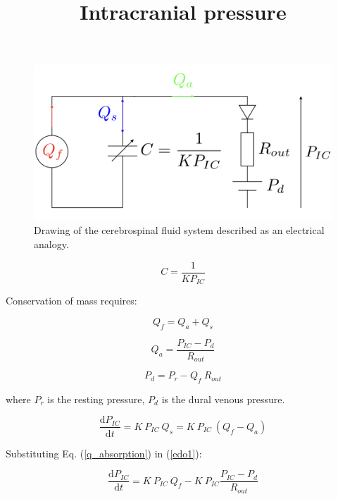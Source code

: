 \documentclass{config}
\title{Intracranial pressure}
\begin{document}
\maketitle

\begin{figure}[H]
\centering
\includegraphics[scale=0.3]{modele0D.png}
\caption{Drawing of the cerebrospinal fluid system described as an electrical analogy.}
\label{schema0D}
\end{figure}

\begin{equation}\label{compliance}
C = \frac{1}{K P_{IC}}
\end{equation}

Conservation of mass requires:

\begin{equation}\label{debit}
Q_f = Q_a + Q_s
\end{equation}

\begin{equation}\label{q_absorption}
Q_a = \frac{P_{IC} - P_d }{R_{out}}
\end{equation}

\begin{equation}\label{Pd}
P_d = P_r - Q_f ~ R_{out}
\end{equation}

where $P_r$ is the resting pressure, $P_d$ is the dural venous pressure.

\begin{equation}\label{edo1}
\frac{\mathrm{d}P_{IC}}{\mathrm{d}t} = K ~ P_{IC} ~ Q_s = K ~ P_{IC } ~ (Q_f - Q_a)
\end{equation}

Substituting Eq. (\ref{q_absorption}) in (\ref{edo1}): 

\begin{equation}\label{edo_final}
\frac{\mathrm{d}P_{IC}}{\mathrm{d}t} = K ~ P_{IC } ~ Q_f - K ~ P_{IC}  \frac{P_{IC} - P_d }{R_{out}}
\end{equation}
\end{document}
